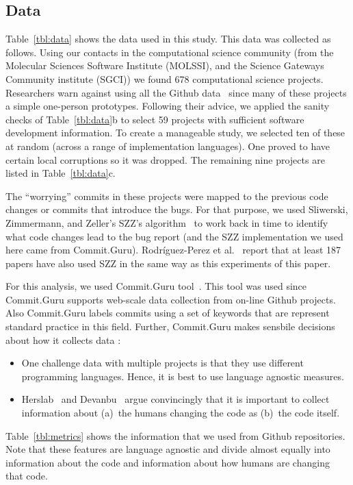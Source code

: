 \documentclass[10pt,journal,compsoc]{IEEEtran}
\newcommand{\bi}{\begin{itemize}[leftmargin=0.4cm]}
\newcommand{\ei}{\end{itemize}}
\newcommand{\tbl}[1]{Table~\ref{tbl:#1}}
\begin{document}
\subsection{Data}

\tbl{data} shows the data used in this study.
This data was collected as follows.
Using our contacts in the computational science community
(from the Molecular Sciences Software Institute (MOLSSI), and the Science Gateways Community institute (SGCI)) we found
678 computational science  projects.
Researchers
warn against using all the Github data~\cite{bird09promise,agrawal2018we, eirini15promise, munaiah17curating} since
many of these projects a simple one-person prototypes.
Following  their advice, we applied the sanity checks of \tbl{data}b 
to select 59  projects with sufficient software development information. 
To create a manageable study, we selected ten of these at random (across a range of implementation
languages). One proved to have certain local corruptions so it was  dropped.
The remaining nine projects are listed in \tbl{data}c.

The ``worrying'' commits in these projects were mapped to the previous code changes or commits that introduce the bugs.
 For that purpose, we used        
Sliwerski, Zimmermann, and Zeller's SZZ's
 algorithm~\cite{costa17szz, Kim08changes, Sliwerski05changes}
 to work back in time to  identify what code changes lead to the bug report
 (and the SZZ implementation we used here came from Commit.Guru).
  Rodríguez-Perez et al.~\cite{RODRIGUEZPEREZ2018164}
 report that at least 187 papers have also used SZZ
 in the same way as this experiments of this paper.
 
 For this analysis, we used  Commit.Guru tool~\cite{commitguru}.
This tool was used since Commit.Guru  supports web-scale data collection from on-line 
Github projects. Also Commit.Guru labels commits using a set of keywords that are represent
standard practice in this field. 
Further, Commit.Guru makes sensbile decisions about how it collects data \cite{mockus00changeskeys, kamei12_jit}:
\bi
\item
One challenge data with multiple projects is
that they  use different programming languages. Hence, it is best to use language agnostic measures.
 \item
 Herslab~\cite{Tsay:2014} and Devanbu~\cite{Rahman:2013} argue convincingly
 that it is important to collect
 information about (a)~the humans changing
 the code as (b)~the code itself.
 \ei
 \tbl{metrics}
 shows the information that we used from Github repositories.  Note that  these
 features are language agnostic and divide almost equally into information about the code and information about how
 humans are changing that code.
 
\end{document}
